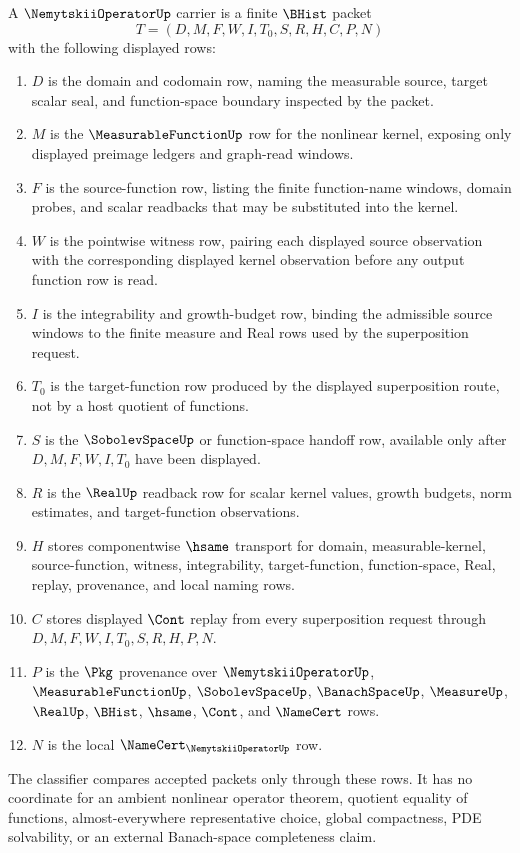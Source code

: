 \begin{definition}
\label{def:nemytskii-operator-carrier}
A $\NemytskiiOperatorUp$ carrier is a finite $\BHist$ packet
$$
T=(D,M,F,W,I,T_0,S,R,H,C,P,N)
$$
with the following displayed rows:
\begin{enumerate}
\item $D$ is the domain and codomain row, naming the measurable source, target scalar seal, and function-space boundary inspected by the packet.
\item $M$ is the $\MeasurableFunctionUp$ row for the nonlinear kernel, exposing only displayed preimage ledgers and graph-read windows.
\item $F$ is the source-function row, listing the finite function-name windows, domain probes, and scalar readbacks that may be substituted into the kernel.
\item $W$ is the pointwise witness row, pairing each displayed source observation with the corresponding displayed kernel observation before any output function row is read.
\item $I$ is the integrability and growth-budget row, binding the admissible source windows to the finite measure and Real rows used by the superposition request.
\item $T_0$ is the target-function row produced by the displayed superposition route, not by a host quotient of functions.
\item $S$ is the $\SobolevSpaceUp$ or function-space handoff row, available only after $D,M,F,W,I,T_0$ have been displayed.
\item $R$ is the $\RealUp$ readback row for scalar kernel values, growth budgets, norm estimates, and target-function observations.
\item $H$ stores componentwise $\hsame$ transport for domain, measurable-kernel, source-function, witness, integrability, target-function, function-space, Real, replay, provenance, and local naming rows.
\item $C$ stores displayed $\Cont$ replay from every superposition request through $D,M,F,W,I,T_0,S,R,H,P,N$.
\item $P$ is the $\Pkg$ provenance over $\NemytskiiOperatorUp$, $\MeasurableFunctionUp$, $\SobolevSpaceUp$, $\BanachSpaceUp$, $\MeasureUp$, $\RealUp$, $\BHist$, $\hsame$, $\Cont$, and $\NameCert$ rows.
\item $N$ is the local $\NameCert_{\NemytskiiOperatorUp}$ row.
\end{enumerate}
The classifier compares accepted packets only through these rows. It has no coordinate for an ambient nonlinear operator theorem, quotient equality of functions, almost-everywhere representative choice, global compactness, PDE solvability, or an external Banach-space completeness claim.
\end{definition}

